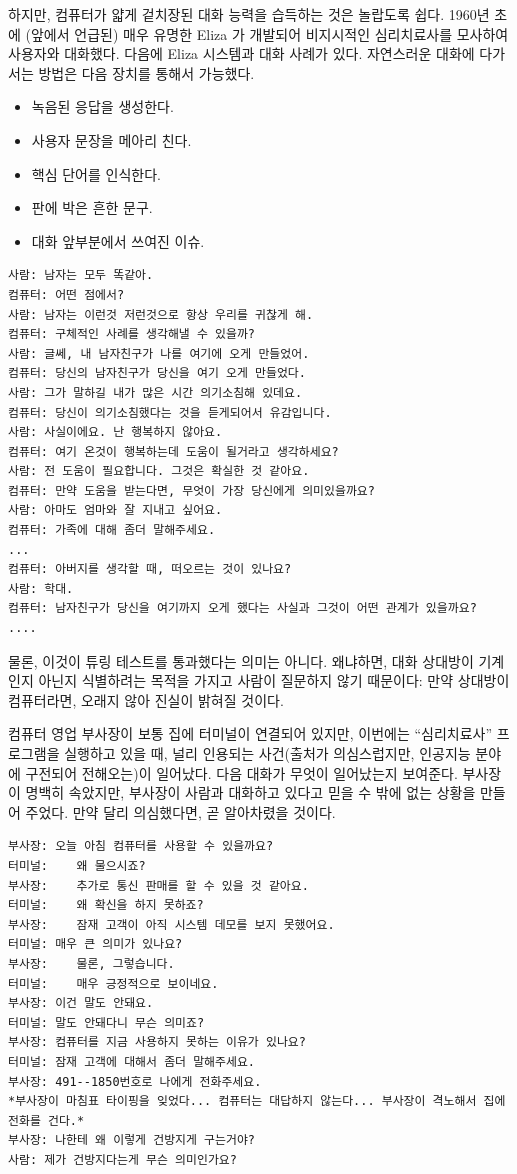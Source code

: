 \documentclass[]{article}
\begin{document}
하지만, 컴퓨터가 얇게 겉치장된 대화 능력을 습득하는 것은 놀랍도록 쉽다.
1960년 초에 (앞에서 언급된) 매우 유명한 Eliza 가 개발되어 비지시적인
심리치료사를 모사하여 사용자와 대화했다. 다음에 Eliza 시스템과 대화
사례가 있다. 자연스러운 대화에 다가서는 방법은 다음 장치를 통해서
가능했다.

\begin{itemize}
\itemsep1pt\parskip0pt
\item
  녹음된 응답을 생성한다.
\item
  사용자 문장을 메아리 친다.
\item
  핵심 단어를 인식한다.
\item
  판에 박은 흔한 문구.
\item
  대화 앞부분에서 쓰여진 이슈.
\end{itemize}

\begin{verbatim}
사람: 남자는 모두 똑같아.
컴퓨터: 어떤 점에서?
사람: 남자는 이런것 저런것으로 항상 우리를 귀찮게 해.
컴퓨터: 구체적인 사례를 생각해낼 수 있을까?
사람: 글쎄, 내 남자친구가 나를 여기에 오게 만들었어.
컴퓨터: 당신의 남자친구가 당신을 여기 오게 만들었다.
사람: 그가 말하길 내가 많은 시간 의기소침해 있데요.
컴퓨터: 당신이 의기소침했다는 것을 듣게되어서 유감입니다.
사람: 사실이에요. 난 행복하지 않아요.
컴퓨터: 여기 온것이 행복하는데 도움이 될거라고 생각하세요?
사람: 전 도움이 필요합니다. 그것은 확실한 것 같아요.
컴퓨터: 만약 도움을 받는다면, 무엇이 가장 당신에게 의미있을까요?
사람: 아마도 엄마와 잘 지내고 싶어요.
컴퓨터: 가족에 대해 좀더 말해주세요.
...
컴퓨터: 아버지를 생각할 때, 떠오르는 것이 있나요?
사람: 학대.
컴퓨터: 남자친구가 당신을 여기까지 오게 했다는 사실과 그것이 어떤 관계가 있을까요?
....
\end{verbatim}

물론, 이것이 튜링 테스트를 통과했다는 의미는 아니다. 왜냐하면, 대화
상대방이 기계인지 아닌지 식별하려는 목적을 가지고 사람이 질문하지 않기
때문이다: 만약 상대방이 컴퓨터라면, 오래지 않아 진실이 밝혀질 것이다.

컴퓨터 영업 부사장이 보통 집에 터미널이 연결되어 있지만, 이번에는
``심리치료사'' 프로그램을 실행하고 있을 때, 널리 인용되는 사건(출처가
의심스럽지만, 인공지능 분야에 구전되어 전해오는)이 일어났다. 다음 대화가
무엇이 일어났는지 보여준다. 부사장이 명백히 속았지만, 부사장이 사람과
대화하고 있다고 믿을 수 밖에 없는 상황을 만들어 주었다. 만약 달리
의심했다면, 곧 알아차렸을 것이다.

\begin{verbatim}
부사장: 오늘 아침 컴퓨터를 사용할 수 있을까요?
터미널:    왜 물으시죠?
부사장:    추가로 통신 판매를 할 수 있을 것 같아요.
터미널:    왜 확신을 하지 못하죠?
부사장:    잠재 고객이 아직 시스템 데모를 보지 못했어요.
터미널: 매우 큰 의미가 있나요?
부사장:    물론, 그렇습니다.
터미널:    매우 긍정적으로 보이네요.
부사장: 이건 말도 안돼요.
터미널: 말도 안돼다니 무슨 의미죠?
부사장: 컴퓨터를 지금 사용하지 못하는 이유가 있나요?
터미널: 잠재 고객에 대해서 좀더 말해주세요.
부사장: 491--1850번호로 나에게 전화주세요.
*부사장이 마침표 타이핑을 잊었다... 컴퓨터는 대답하지 않는다... 부사장이 격노해서 집에 전화를 건다.*
부사장: 나한테 왜 이렇게 건방지게 구는거야?
사람: 제가 건방지다는게 무슨 의미인가요?
\end{verbatim}
\end{document}
